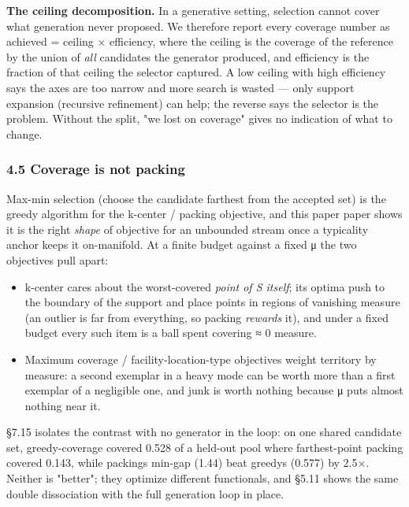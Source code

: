 \documentclass[
  10pt,
]{article}
\providecommand{\tightlist}{%
  \setlength{\itemsep}{0pt}\setlength{\parskip}{0pt}}
\theoremstyle{plain}
\theoremstyle{definition}
\providecommand{\tightlist}{\setlength{\itemsep}{0pt}\setlength{\parskip}{0pt}}
\begin{document}
\textbf{The ceiling decomposition.} In a generative setting, selection
cannot cover what generation never proposed. We therefore report every
coverage number as achieved = ceiling × efficiency, where the ceiling is
the coverage of the reference by the union of \emph{all} candidates the
generator produced, and efficiency is the fraction of that ceiling the
selector captured. A low ceiling with high efficiency says the axes are
too narrow and more search is wasted --- only support expansion
(recursive refinement) can help; the reverse says the selector is the
problem. Without the split, "we lost on coverage" gives no indication of
what to change.

\subsubsection{4.5 Coverage is not
packing}\label{45-coverage-is-not-packing}

Max-min selection (choose the candidate farthest from the accepted set)
is the greedy algorithm for the k-center / packing objective, and this
paper paper shows it is the right \emph{shape} of objective for an
unbounded stream once a typicality anchor keeps it on-manifold. At a
finite budget against a fixed μ the two objectives pull apart:

\begin{itemize}
\tightlist
\item
  k-center cares about the worst-covered \emph{point of S itself}; its
  optima push to the boundary of the support and place points in regions
  of vanishing measure (an outlier is far from everything, so packing
  \emph{rewards} it), and under a fixed budget every such item is a ball
  spent covering ≈ 0 measure.
\item
  Maximum coverage / facility-location-type objectives weight territory
  by measure: a second exemplar in a heavy mode can be worth more than a
  first exemplar of a negligible one, and junk is worth nothing because
  μ puts almost nothing near it.
\end{itemize}

§7.15 isolates the contrast with no generator in the loop: on one shared
candidate set, greedy-coverage covered 0.528 of a held-out pool where
farthest-point packing covered 0.143, while packing\textquotesingle s
min-gap (1.44) beat greedy\textquotesingle s (0.577) by 2.5×. Neither is
"better"; they optimize different functionals, and §5.11 shows the same
double dissociation with the full generation loop in place.
\end{document}
